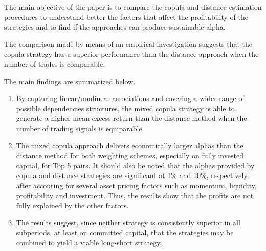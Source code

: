 \documentclass[a4paper]{article}
\begin{document}
The main objective of the paper is to compare the copula and distance estimation procedures to understand better the factors that affect the profitability of the strategies and to find if the approaches can produce sustainable alpha.

 The comparison made by means of an empirical investigation suggests that the copula strategy has a superior performance than the distance approach when the number of trades is comparable.
 
The main findings are summarized below.
	
	\begin{enumerate}
				
		
	\item By capturing linear/nonlinear associations and covering a wider range of possible dependencies structures, the mixed copula strategy is able to generate a higher mean excess return than the distance method when the number of trading signals is equiparable.
		
		\vspace{0.3cm}
		
		\item 	The mixed copula approach delivers economically larger alphas than the distance method for both weighting schemes, especially on fully invested capital, for Top 5 pairs. It should also be noted that the alphas provided by copula and distance strategies are significant at 1\% and 10\%, respectively, after accouting for several asset pricing factors such as momentum, liquidity, profitability and investment. Thus, the results show that the profits are not fully explained by the other factors.
		
		\vspace{0.3cm}
		
		
		\item	The results suggest, since neither strategy is consistently superior in all subperiods, at least on committed capital, that the strategies may be combined to yield a viable long-short strategy.
			
	\end{enumerate}

\vspace{0.3cm}
	
\end{document}
